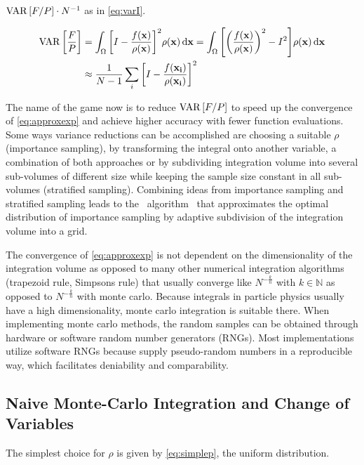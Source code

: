 \(\operatorname{VAR}\qty[F/P]\cdot N^{-1}\) as in \cref{eq:varI}.

\begin{align}
  \operatorname{VAR}\qty[\frac{F}{P}] &= \int_\Omega \qty[I -
  \frac{f(\vb{x})}{\rho(\vb{x})}]^2 \rho({\vb{x}}) \dd{\vb{x}} =
  \int_\Omega \qty[\qty(\frac{f(\vb{x})}{\rho(\vb{x})})^2 -
  I^2]\rho({\vb{x}}) \dd{\vb{x}}   \label{eq:varI}
 \\
  &\approx \frac{1}{N - 1}\sum_i \qty[I -
  \frac{f(\vb{x_i})}{\rho(\vb{x_i})}]^2  \label{eq:varI-approx}
\end{align}

The name of the game now is to reduce \(\operatorname{VAR}\qty[F/P]\) to speed up the
convergence of \cref{eq:approxexp} and achieve higher accuracy with
fewer function evaluations. Some ways variance reductions can be
accomplished are choosing a suitable \(\rho\) (importance sampling),
by transforming the integral onto another variable, a combination of
both approaches or by subdividing integration volume into several
sub-volumes of different size while keeping the sample size constant
in all sub-volumes (stratified sampling). Combining ideas from
importance sampling and stratified sampling leads to the \vegas\
algorithm~\cite{Lepage:19781an} that approximates the optimal
distribution of importance sampling by adaptive subdivision of the
integration volume into a grid.

The convergence of \cref{eq:approxexp} is not dependent on the
dimensionality of the integration volume as opposed to many other
numerical integration algorithms (trapezoid rule, Simpsons rule) that
usually converge like \(N^{-\frac{k}{n}}\) with \(k\in\mathbb{N}\) as
opposed to \(N^{-\frac{k}{n}}\) with monte carlo. Because integrals in
particle physics usually have a high dimensionality, monte carlo
integration is suitable there. When implementing monte carlo methods,
the random samples can be obtained through hardware or software random
number generators (RNGs). Most implementations utilize software RNGs
because supply pseudo-random numbers in a reproducible way, which
facilitates deniability and comparability.

\subsection{Naive Monte-Carlo Integration and Change of Variables}
\label{sec:naivechange}

The simplest choice for \(\rho\) is given
by \cref{eq:simplep}, the uniform distribution.

